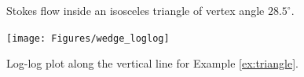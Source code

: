 \begin{example}
\begin{figure}[H]
	\caption{Stokes flow inside an isosceles triangle of vertex angle $28.5^\circ$.}
	\label{fig:wedge}
\end{figure} 
\begin{figure}[H]
	\centering
	\texttt{[image: Figures/wedge\_loglog]}
	\caption{Log-log plot along the vertical line for Example \ref{ex:triangle}.}
	\label{fig:wedge_loglog}
\end{figure}
\end{example}


